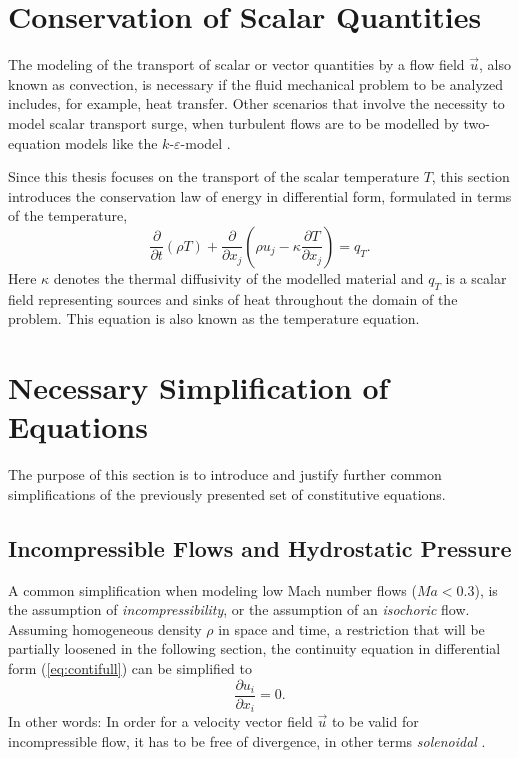 \section{Conservation of Scalar Quantities}

The modeling of the transport of scalar or vector quantities by a flow field \(\vec{u}\), also known as convection, is necessary if the fluid mechanical problem to be analyzed includes, for example, heat transfer. Other scenarios that involve the necessity to model scalar transport surge, when turbulent flows are to be modelled by two-equation models like the \(k\)-\(\varepsilon\)-model \cite{pope00}. 
    
Since this thesis focuses on the transport of the scalar temperature \(T\), this section introduces the conservation law of energy in differential form, formulated in terms of the temperature,
\begin{displaymath}
\frac{\partial}{\partial t}\left(\rho T \right) + \frac{\partial}{\partial x_j} \left( \rho u_j - \kappa \frac{\partial T}{\partial x_j} \right) = q_T.
\end{displaymath}
Here \(\kappa\) denotes the thermal diffusivity of the modelled material and \(q_T\) is a scalar field representing sources and sinks of heat throughout the domain of the problem. This equation is also known as the temperature equation.

\section{Necessary Simplification of Equations}

The purpose of this section is to introduce and justify further common simplifications of the previously presented set of constitutive equations. 

\subsection{Incompressible Flows and Hydrostatic Pressure}

A common simplification when modeling low Mach number flows (\(Ma < 0.3\)), is the assumption of \emph{incompressibility}, or the assumption of an \emph{isochoric} flow. Assuming homogeneous density \(\rho\) in space and time, a restriction that will be partially loosened in the following section, the continuity equation in differential form (\ref{eq:contifull}) can be simplified to
\begin{displaymath}
  \frac{\partial u_i}{\partial x_i} = 0.
\end{displaymath}
In other words: In order for a velocity vector field \(\vec{u}\) to be valid for incompressible flow, it has to be free of divergence, in other terms \emph{solenoidal} \cite{spurk10,aris62}.

